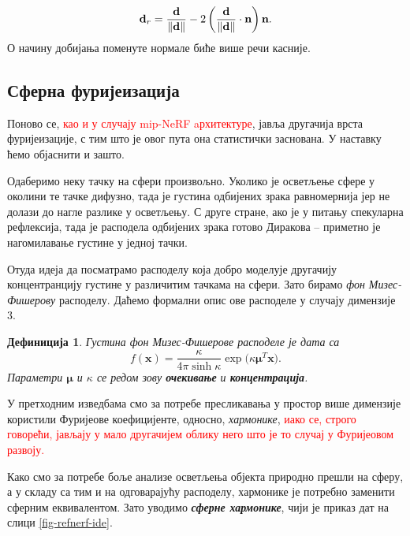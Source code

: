 \documentclass[12pt, a4paper, twoside]{book}
\numberwithin{equation}{chapter}
\numberwithin{theorem}{section}
\newtheorem{definition}{Дефиниција}
\numberwithin{definition}{section}
\numberwithin{definitionChapter}{chapter}
\begin{document}
	\begin{equation}
		\textbf{d}_r = \frac{\textbf{d}}{\left\Vert\mathbf{d}\right\Vert}
		-2\left(\frac{\textbf{d}}{\left\Vert\mathbf{d}\right\Vert} \cdot
			\boldsymbol{\textbf{n}}\right)\textbf{\text{n}}
		\label{eqn-reflection}.
	\end{equation}
О начину добијања поменуте нормале биће више речи касније.

\subsection{Сферна фуријеизација}
Поново се, \textcolor{red}{као и у случају mip-NeRF aрхитектуре}, јавља другачија врста фуријеизације, с тим што је овог пута она статистички
заснована. У наставку ћемо објаснити и зашто.

Одаберимо неку тачку на сфери произвољно. Уколико је осветљење сфере у околини те тачке дифузно, тада је
густина одбијених зрака равномернија јер не долази до нагле разлике у осветљењу. С друге стране,
ако је у питању спекуларна рефлексија, тада је расподела одбијених зрака готово Диракова -- приметно
је нагомилавање густине у једној тачки.

Отуда идеја да посматрамо расподелу која добро моделује другачију концентранцију густине у различитим
тачкама на сфери. Зато бирамо \textit{фон Мизес-Фишерову} расподелу. Даћемо формални опис ове
расподеле у случају димензије 3.

	\begin{definition}
		Густина фон Мизес-Фишерове расподеле је дата са
		$$f(\textbf{x}) = \frac{\kappa}{4\pi \sinh\kappa} \exp(\kappa\boldsymbol{\mu}^T\textbf{x)}.$$
		Параметри $\boldsymbol{\mu}$ и $\kappa$ се редом зову \textbf{очекивање} и \textbf{концентрација}.
	\end{definition}

У претходним изведбама смо за потребе пресликавања у простор  више димензије користили Фуријеове коефицијенте,
односно, \textit{хармонике}, \textcolor{red}{иако се, строго говорећи, јављају у мало другачијем облику него што је то
случај у Фуријеовом развоју.}

Како смо за потребе боље анализе осветљења објекта природно прешли на сферу, а у складу са тим и на одговарајућу
расподелу, хармонике је потребно заменити сферним еквивалентом. Зато уводимо \textbf{\textit{сферне хармонике}}, чији
је приказ дат на слици \ref{fig-refnerf-ide}.
\end{document}
